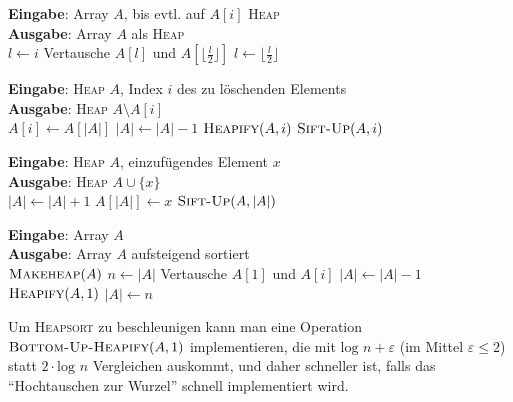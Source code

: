 \documentclass[a4paper,10pt]{scrartcl}
\newcommand{\tbf}{\textbf}
\newcommand{\tsc}{\textsc}
\newcommand{\agn}{\leftarrow}
\newcommand{\Eingabe}[1]{\STATE \tbf{Eingabe}: #1 \\}
\newcommand{\Ausgabe}[1]{\STATE \tbf{Ausgabe}: #1 \\}
\begin{document}
\begin{algorithm}
\caption{$\tsc{Sift-Up}(A,i)$ $\in O(\text{log } n)$}
\begin{algorithmic}
\Eingabe{Array $A$, bis evtl. auf $A[i]$ \tsc{Heap}}
\Ausgabe{Array $A$ als \tsc{Heap}}
\STATE $l \agn i$
	\STATE Vertausche $A[l]$ und $A[\lfloor \frac{l}{2} \rfloor]$
	\STATE $l \agn \lfloor \frac{l}{2} \rfloor$
\ENDWHILE
\end{algorithmic}
\end{algorithm}

\begin{algorithm}
\caption{$\tsc{Delete}(A,i)$ $\in O(\text{log } n)$}
\begin{algorithmic}
\Eingabe{\tsc{Heap} $A$, Index $i$ des zu löschenden Elements}
\Ausgabe{\tsc{Heap} $A \setminus A[i]$}
\STATE $A[i] \agn A[|A|]$
\STATE $|A| \agn |A| - 1$
	\STATE $\tsc{Heapify}(A,i)$
\ELSE 
	\STATE $\tsc{Sift-Up}(A,i)$
\ENDIF
\end{algorithmic}
\end{algorithm}

\begin{algorithm}
\caption{$\tsc{Insert}(A,x)$ $\in \Theta(\text{log } n)$}
\begin{algorithmic}
\Eingabe{\tsc{Heap} $A$, einzufügendes Element $x$}
\Ausgabe{\tsc{Heap} $A \cup \{x\}$}
\STATE $|A| \agn |A| + 1$
\STATE $A[|A|] \agn x$
\STATE $\tsc{Sift-Up}(A,|A|)$
\end{algorithmic}
\end{algorithm}

\begin{algorithm}
\caption{$\tsc{Heapsort}(A)$ $\in O(n \text{ log } n)$}
\begin{algorithmic}
\Eingabe{Array $A$}
\Ausgabe{Array $A$ aufsteigend sortiert}
\STATE $\tsc{Makeheap}(A)$
\STATE $n \agn |A|$
	\STATE Vertausche $A[1]$ und $A[i]$
	\STATE $|A| \agn |A| - 1$
	\STATE $\tsc{Heapify}(A,1)$
\ENDFOR
\STATE $|A| \agn n$
\end{algorithmic}
\end{algorithm}

Um \tsc{Heapsort} zu beschleunigen kann man eine Operation $\tsc{Bottom-Up-Heapify}(A,1)$ implementieren, die mit $\text{log } n + \varepsilon$ (im Mittel $\varepsilon \leq 2$) statt $2 \cdot \text{log } n$ Vergleichen auskommt, und daher schneller ist, falls das ``Hochtauschen zur Wurzel'' schnell implementiert wird.
\end{document}
